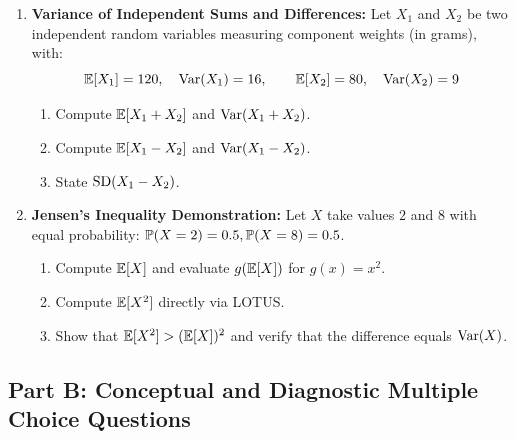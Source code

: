 \begin{enumerate}
    \item \textbf{Variance of Independent Sums and Differences:} Let $X_1$ and $X_2$ be two independent random variables measuring component weights (in grams), with:
    $$\E[X_1] = 120, \quad \Var(X_1) = 16, \qquad \E[X_2] = 80, \quad \Var(X_2) = 9$$
    \begin{enumerate}
        \item Compute $\E[X_1 + X_2]$ and $\Var(X_1 + X_2)$.
        \item Compute $\E[X_1 - X_2]$ and $\Var(X_1 - X_2)$.
        \item State $\SD(X_1 - X_2)$.
    \end{enumerate}

    \item \textbf{Jensen's Inequality Demonstration:} Let $X$ take values $2$ and $8$ with equal probability: $\P(X = 2) = 0.5, \P(X = 8) = 0.5$.
    \begin{enumerate}
        \item Compute $\E[X]$ and evaluate $g(\E[X])$ for $g(x) = x^2$.
        \item Compute $\E[X^2]$ directly via LOTUS.
        \item Show that $\E[X^2] > (\E[X])^2$ and verify that the difference equals $\Var(X)$.
    \end{enumerate}
\end{enumerate}

\subsection*{Part B: Conceptual and Diagnostic Multiple Choice Questions}

